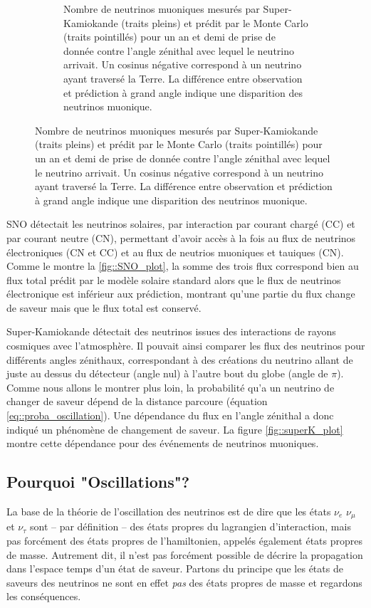 \begin{figure}[htbp]
\begin{subfigure}[t]{0.4\textwidth}
                    \caption{Nombre de neutrinos muoniques mesurés par Super-Kamiokande (traits pleins) et prédit par le Monte Carlo (traits pointillés) pour un an et demi de prise de donnée contre l'angle zénithal avec lequel le neutrino arrivait\cite{Fukuda1998}. Un cosinus négative correspond à un neutrino ayant traversé la Terre. La différence entre observation et prédiction à grand angle indique une disparition des neutrinos muonique.}
                    \label{fig::superK_plot}
                \end{subfigure}
            \end{figure}
            
            SNO détectait les neutrinos solaires, par interaction par courant chargé (CC) et par courant neutre (CN), permettant d'avoir accès à la fois au flux de neutrinos électroniques (CN et CC) et au flux de neutrios muoniques et tauiques (CN). Comme le montre la \autoref{fig::SNO_plot}, la somme des trois flux correspond bien au flux total prédit par le modèle solaire standard alors que le flux de neutrinos électronique est inférieur aux prédiction, montrant qu'une partie du flux change de saveur mais que le flux total est conservé.
            
            Super-Kamiokande détectait des neutrinos issues des interactions de rayons cosmiques avec l'atmosphère. Il pouvait ainsi comparer les flux des neutrinos pour différents angles zénithaux, correspondant à des créations du neutrino allant de juste au dessus du détecteur (angle nul) à l'autre bout du globe (angle de $\pi$). Comme nous allons le montrer plus loin, la probabilité qu'a un neutrino de changer de saveur dépend de la distance parcoure (équation \eqref{eq::proba_oscillation}). Une dépendance du flux en l'angle zénithal a donc indiqué un phénomène de changement de saveur. La figure \autoref{fig::superK_plot} montre cette dépendance pour des événements de neutrinos muoniques.
    
        \subsection{Pourquoi "Oscillations"?}\label{sec::oscillations}
            La base de la théorie de l'oscillation des neutrinos est de dire que les états $\nu_e$ $\nu_{\mu}$ et $\nu_{\tau}$ sont -- par définition -- des états propres du lagrangien d'interaction, mais pas forcément des états propres de l'hamiltonien, appelés également états propres de masse. Autrement dit, il n'est pas forcément possible de décrire la propagation dans l'espace temps d'un état de saveur. Partons du principe que les états de saveurs des neutrinos ne sont en effet \textit{pas} des états propres de masse et regardons les conséquences. 
            
